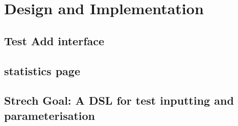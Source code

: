 
\chapter{Design and Implementation}

\section{Test Add interface}

\section{statistics page}

\section{Strech Goal: A DSL for test inputting and parameterisation }